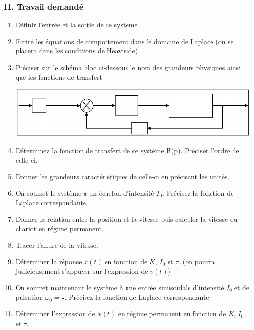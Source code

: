 \subsubsection{II. Travail demand\'e}
\begin{enumerate}
\item D\'efinir l'entr\'ee et la sortie de ce syst\`eme
\item Ecrire les \'equations de comportement dans le domaine de Laplace (on se placera dans les
conditions de Heaviside)
\item Pr\'eciser sur le sch\'ema bloc ci-dessous le nom des grandeurs physiques ainsi que les
fonctions de transfert\\
\hspace*{0mm}
\begin{center} \includegraphics[scale=0.45]{png/img2_prob1.png}\end{center}
\hspace*{0mm}
\item D\'eterminez la fonction de transfert de ce syst\`eme H(p). Pr\'eciser l'ordre de celle-ci.
\item Donner les grandeurs caract\'eristiques de celle-ci en pr\'ecisant les unit\'es.
\item On soumet le syst\`eme \`a un \'echelon d'intensit\'e $I_0$. Pr\'ecisez la fonction de Laplace
correspondante.
\item Donner la relation entre la position et la vitesse puis calculer la vitesse du chariot en r\'egime
permanent.
\item Tracer l'allure de la vitesse.
\item D\'eterminer la r\'eponse $x(t)$ en fonction de $K$, $I_0$ et $\tau$. (on pourra judicieusement s'appuyer
sur l'expression de $v(t)$)
\item On soumet maintenant le syst\`eme \`a une entr\'ee sinuso\"{i}dale d'intensit\'e $I_0$ et de pulsation $\omega_0=\frac{1}{\tau}$. Pr\'ecisez la fonction de Laplace correspondante.
\item D\'eterminer l'expression de $x(t)$ en r\'egime permanent en fonction de $K$, $I_0$ et $\tau$.
\end{enumerate}

